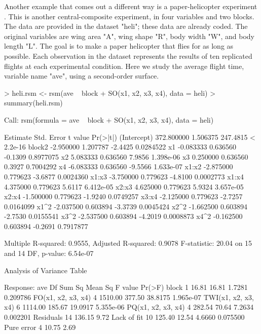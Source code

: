 \documentclass[article,nojss]{jss}
\def\rsm{\pkg{rsm}}
\begin{document}
Another example that comes out a different way is a paper-helicopter experiment \cite[Table 12.5]{Box05}.  This is another central-composite experiment, in four variables and two blocks.  The data are provided in the \rsm{} dataset "heli"; these data are already coded.  The original variables are wing area "A", wing shape "R", body width "W", and body length "L".  The goal is to make a paper helicopter that flies for as long as possible.  Each observation in the dataset represents the results of ten replicated flights at each experimental condition.  Here we study the average flight time, variable name "ave", using a second-order surface.
\begin{Schunk}
\begin{Sinput}
> heli.rsm <- rsm(ave ~ block + SO(x1, x2, x3, x4), data = heli)
> summary(heli.rsm)
\end{Sinput}
\begin{Soutput}
Call:
rsm(formula = ave ~ block + SO(x1, x2, x3, x4), data = heli)

              Estimate Std. Error  t value  Pr(>|t|)
(Intercept) 372.800000   1.506375 247.4815 < 2.2e-16
block2       -2.950000   1.207787  -2.4425 0.0284522
x1           -0.083333   0.636560  -0.1309 0.8977075
x2            5.083333   0.636560   7.9856 1.398e-06
x3            0.250000   0.636560   0.3927 0.7004292
x4           -6.083333   0.636560  -9.5566 1.633e-07
x1:x2        -2.875000   0.779623  -3.6877 0.0024360
x1:x3        -3.750000   0.779623  -4.8100 0.0002773
x1:x4         4.375000   0.779623   5.6117 6.412e-05
x2:x3         4.625000   0.779623   5.9324 3.657e-05
x2:x4        -1.500000   0.779623  -1.9240 0.0749257
x3:x4        -2.125000   0.779623  -2.7257 0.0164099
x1^2         -2.037500   0.603894  -3.3739 0.0045424
x2^2         -1.662500   0.603894  -2.7530 0.0155541
x3^2         -2.537500   0.603894  -4.2019 0.0008873
x4^2         -0.162500   0.603894  -0.2691 0.7917877

Multiple R-squared:  0.9555,	Adjusted R-squared:  0.9078 
F-statistic: 20.04 on 15 and 14 DF,  p-value: 6.54e-07

Analysis of Variance Table

Response: ave
                    Df  Sum Sq Mean Sq F value    Pr(>F)
block                1   16.81   16.81  1.7281  0.209786
FO(x1, x2, x3, x4)   4 1510.00  377.50 38.8175 1.965e-07
TWI(x1, x2, x3, x4)  6 1114.00  185.67 19.0917 5.355e-06
PQ(x1, x2, x3, x4)   4  282.54   70.64  7.2634  0.002201
Residuals           14  136.15    9.72                  
Lack of fit         10  125.40   12.54  4.6660  0.075500
Pure error           4   10.75    2.69                  


\end{Soutput}
\end{Schunk}
\end{document}
